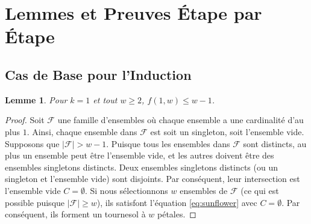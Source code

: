 \documentclass[12pt,a4paper]{article}
\newtheorem{lemma}[theorem]{Lemme}
\begin{document}
\section{Lemmes et Preuves \'Etape par \'Etape}

\subsection{Cas de Base pour l'Induction}
\begin{lemma} \label{lem:base_case}
Pour $k=1$ et tout $w \ge 2$, $f(1, w) \le w - 1$.
\end{lemma}
\begin{proof}
Soit $\mathcal{F}$ une famille d'ensembles o\`u chaque ensemble a une cardinalit\'e d'au plus $1$. Ainsi, chaque ensemble dans $\mathcal{F}$ est soit un singleton, soit l'ensemble vide.
Supposons que $|\mathcal{F}| > w - 1$. Puisque tous les ensembles dans $\mathcal{F}$ sont distincts, au plus un ensemble peut \^etre l'ensemble vide, et les autres doivent \^etre des ensembles singletons distincts.
Deux ensembles singletons distincts (ou un singleton et l'ensemble vide) sont disjoints. Par cons\'equent, leur intersection est l'ensemble vide $C = \emptyset$.
Si nous s\'electionnons $w$ ensembles de $\mathcal{F}$ (ce qui est possible puisque $|\mathcal{F}| \ge w$), ils satisfont l'\'equation \eqref{eq:sunflower} avec $C = \emptyset$. Par cons\'equent, ils forment un tournesol \`a $w$ p\'etales.
\end{proof}
\end{document}
